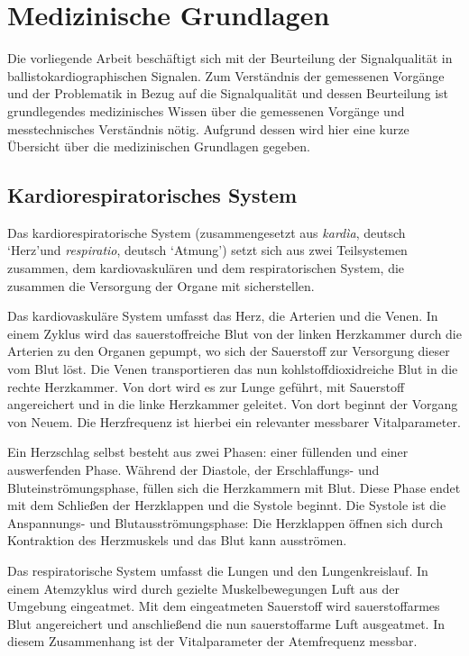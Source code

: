 \section{Medizinische Grundlagen}\label{med-grundlagen}

Die vorliegende Arbeit beschäftigt sich mit der Beurteilung der Signalqualität in ballistokardiographischen Signalen. Zum Verständnis der gemessenen Vorgänge und der Problematik in Bezug auf die Signalqualität und dessen Beurteilung ist grundlegendes medizinisches Wissen über die gemessenen Vorgänge und messtechnisches Verständnis nötig. Aufgrund dessen wird hier eine kurze Übersicht über die medizinischen Grundlagen gegeben.

	\subsection{Kardiorespiratorisches System}
	
	Das kardiorespiratorische System (zusammengesetzt aus \textit{kardìa}, deutsch \textquoteleft Herz\textquoteright und \textit{respiratio}, deutsch \textquoteleft Atmung\textquoteright) setzt sich aus zwei Teilsystemen zusammen, dem kardiovaskulären und dem respiratorischen System, die zusammen die Versorgung der Organe mit sicherstellen.
	
	Das kardiovaskuläre System umfasst das Herz, die Arterien und die Venen. In einem Zyklus wird das sauerstoffreiche Blut von der linken Herzkammer durch die Arterien zu den Organen gepumpt, wo sich der Sauerstoff zur Versorgung dieser vom Blut löst. Die Venen transportieren das nun kohlstoffdioxidreiche Blut in die rechte Herzkammer. Von dort wird es zur Lunge geführt, mit Sauerstoff angereichert und in die linke Herzkammer geleitet. Von dort beginnt der Vorgang von Neuem. Die Herzfrequenz ist hierbei ein relevanter messbarer Vitalparameter.
	
	Ein Herzschlag selbst besteht aus zwei Phasen: einer füllenden und einer auswerfenden Phase. Während der Diastole, der Erschlaffungs- und Bluteinströmungsphase, füllen sich die Herzkammern mit Blut. Diese Phase endet mit dem Schließen der Herzklappen und die Systole beginnt. Die Systole ist die Anspannungs- und Blutausströmungsphase: Die Herzklappen öffnen sich durch Kontraktion des Herzmuskels und das Blut kann ausströmen.
	
	Das respiratorische System umfasst die Lungen und den Lungenkreislauf. In einem Atemzyklus wird durch gezielte Muskelbewegungen Luft aus der Umgebung eingeatmet. Mit dem eingeatmeten Sauerstoff wird sauerstoffarmes Blut angereichert und anschließend die nun sauerstoffarme Luft ausgeatmet. In diesem Zusammenhang ist der Vitalparameter der Atemfrequenz messbar.

